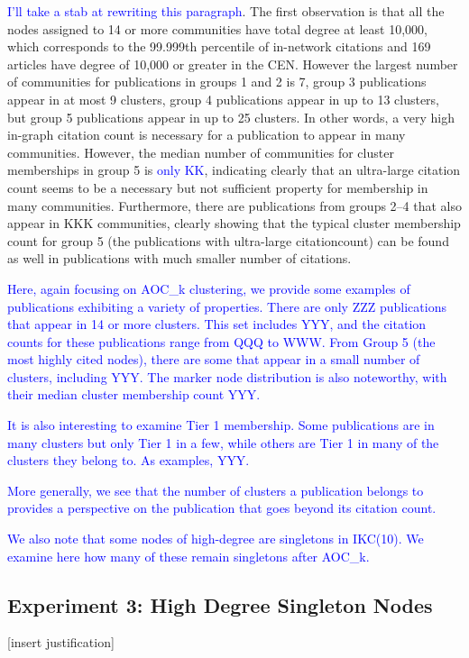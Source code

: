 \documentclass[12pt, oneside]{article}   	%
\begin{document}
\textcolor{blue}{I'll take a stab at rewriting this paragraph}.
The first observation is that all the nodes assigned to 14 or more communities have total degree at least 10,000, which corresponds to the 99.999th percentile of in-network citations and 169 articles have degree of 10,000 or greater in the CEN. 
However the largest number of communities for publications in groups 1 and 2 is 7, group 3 publications appear in at most 9 clusters, group 4 publications appear in up to 13 clusters, 
but group 5 publications appear in up to 25 clusters. In other words, a very high in-graph citation count is necessary  for a publication to appear in many communities. However, the median number of communities for cluster memberships in group 5 is \textcolor{blue}{only KK}, indicating clearly that  an ultra-large citation count seems to be a necessary but not sufficient property for membership in many communities. Furthermore, there are publications from groups 2--4 that also appear in KKK communities, clearly showing that the typical cluster membership count for group 5 (the publications with ultra-large citationcount) can be found as well in publications with much smaller number of citations.

\textcolor{blue}{
Here, again focusing on AOC\_k clustering, we provide some examples
of publications exhibiting a variety of properties.
There are only ZZZ  publications that appear in 14 or more
clusters.  This set includes YYY, and the citation counts for
these publications range from QQQ to WWW.
From Group 5 (the most highly cited nodes), there are some that
appear in a small number of clusters, 
including YYY.
The marker node distribution is also noteworthy, with their
median cluster membership count YYY.
}

\textcolor{blue}{It is also interesting to examine Tier 1 membership.
Some publications are in many clusters but only Tier 1 in a few,
while others are Tier 1 in many of the clusters they belong to.
As examples, YYY.}

\textcolor{blue}{More generally, we see that the number of
clusters a publication belongs to provides a perspective on the publication
that goes beyond its citation count.}


\textcolor{blue}{
We also note that some nodes of high-degree are singletons in IKC(10).
We examine here how many of these remain singletons after
 AOC\_k.}
 
 \subsection{Experiment 3: High Degree Singleton Nodes} [insert justification]
\end{document}

